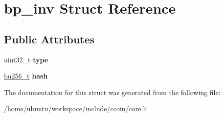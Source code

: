 \hypertarget{structbp__inv}{\section{bp\-\_\-inv Struct Reference}
\label{structbp__inv}
}
\subsection*{Public Attributes}
\begin{DoxyCompactItemize}
\item 
\hypertarget{structbp__inv_ab37bdd259b288c0d3d7445f2b36a89dd}{uint32\-\_\-t {\bfseries type}}\label{structbp__inv_ab37bdd259b288c0d3d7445f2b36a89dd}

\item 
\hypertarget{structbp__inv_a6ab245f31511309f79e1cbda5549ae33}{\hyperlink{structbu256}{bu256\-\_\-t} {\bfseries hash}}\label{structbp__inv_a6ab245f31511309f79e1cbda5549ae33}

\end{DoxyCompactItemize}


The documentation for this struct was generated from the following file\-:\begin{DoxyCompactItemize}
\item 
/home/ubuntu/workspace/include/ccoin/core.\-h\end{DoxyCompactItemize}
